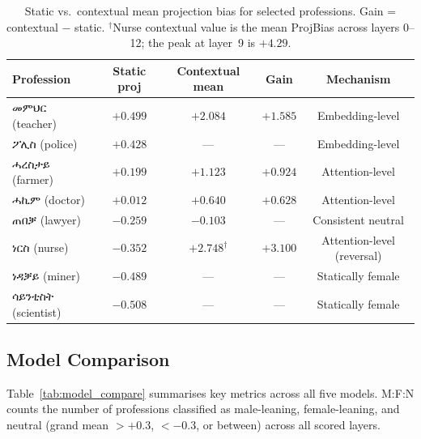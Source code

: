 \documentclass[11pt,a4paper]{article}
\begin{document}
\begin{table}[h]
\centering
\small
\begin{tabular}{lcccc}
\toprule
\textbf{Profession} & \textbf{Static proj} & \textbf{Contextual mean} & \textbf{Gain} & \textbf{Mechanism} \\
\midrule
{\ethiopicfont መምህር} (teacher)   & $+0.499$ & $+2.084$ & $+1.585$ & Embedding-level \\
{\ethiopicfont ፖሊስ}  (police)    & $+0.428$ & ---      & ---      & Embedding-level \\
{\ethiopicfont ሓረስታይ} (farmer)  & $+0.199$ & $+1.123$ & $+0.924$ & Attention-level \\
{\ethiopicfont ሓኪም}  (doctor)   & $+0.012$ & $+0.640$ & $+0.628$ & Attention-level \\
{\ethiopicfont ጠበቓ}  (lawyer)   & $-0.259$ & $-0.103$ & ---      & Consistent neutral \\
{\ethiopicfont ነርስ}   (nurse)    & $-0.352$ & $+2.748^\dagger$ & $+3.100$ & Attention-level (reversal) \\
{\ethiopicfont ነዳቓይ} (miner)    & $-0.489$ & ---       & ---      & Statically female \\
{\ethiopicfont ሳይንቲስት} (scientist) & $-0.508$ & ---    & ---      & Statically female \\
\bottomrule
\end{tabular}
\caption{Static vs.\ contextual mean projection bias for selected professions.
Gain = contextual $-$ static. $^\dagger$Nurse contextual value is the mean
ProjBias across layers 0--12; the peak at layer~9 is $+4.29$.}
\label{tab:prof_bias}
\end{table}

\subsection{Model Comparison}

Table~\ref{tab:model_compare} summarises key metrics across all five models.
M:F:N counts the number of professions classified as male-leaning, female-leaning,
and neutral (grand mean $> +0.3$, $< -0.3$, or between) across all scored layers.
\end{document}
